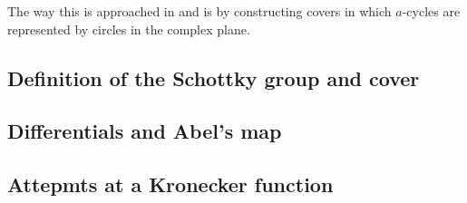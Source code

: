 The way this is approached in \cite{ComputationalSchottky} and \cite{Cha22} is by constructing covers in which $a$-cycles are represented by circles in the complex plane.

\subsection{Definition of the Schottky group and cover}
\cite{Cha22}
\cite{ComputationalSchottky}

\subsection{Differentials and Abel's map}\label{secB12:SchottkyDifAndAbel}
\cite{Cha22}
\cite{ComputationalSchottky}

\subsection{Attepmts at a Kronecker function}
\cite{Cha22}


